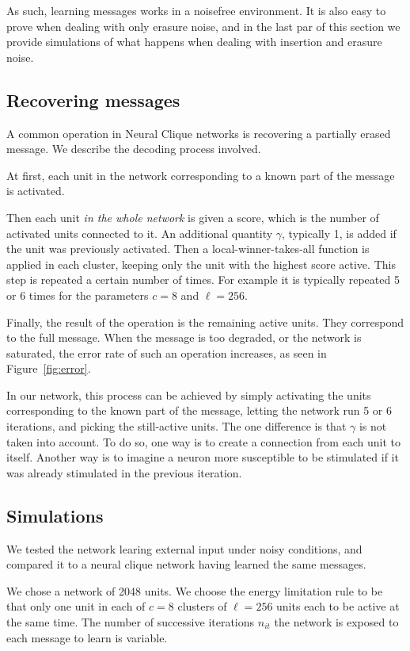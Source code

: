 \documentclass[journal]{IEEEtran}
\begin{document}
As such, learning messages works in a noisefree environment. It is also easy to prove when dealing with only erasure noise, and in the last par of this section we provide simulations of what happens when dealing with insertion and erasure noise.

\subsection{Recovering messages}

A common operation in Neural Clique networks is recovering a partially erased message. We describe the decoding process involved.

At first, each unit in the network corresponding to a known part of the message is activated. 

Then each unit \emph{in the whole network} is given a score, which is the number of activated units connected to it. An additional quantity $\gamma$, typically 1, is added if the unit was previously activated. Then a local-winner-takes-all function is applied in each cluster, keeping only the unit with the highest score active. This step is repeated a certain number of times. For example it is typically repeated 5 or 6 times for the parameters $c=8$ and $\ell=256$.

Finally, the result of the operation is the remaining active units. They correspond to the full message. When the message is too degraded, or the network is saturated, the error rate of such an operation increases, as seen in Figure~\ref{fig:error}.

In our network, this process can be achieved by simply activating the units corresponding to the known part of the message, letting the network run 5 or 6 iterations, and picking the still-active units. The one difference is that $\gamma$ is not taken into account. To do so, one way is to create a connection from each unit to itself. Another way is to imagine a neuron more susceptible to be stimulated if it was already stimulated in the previous iteration.

\subsection{Simulations}

We tested the network learing external input under noisy conditions, and compared it to a neural clique network having learned the same messages.

We chose a network of 2048 units. We choose the energy limitation rule to be that only one unit in each of $c=8$ clusters of $\ell=256$ units each to be active at the same time. The number of successive iterations $n_{it}$ the network is exposed to each message to learn is variable. 
\end{document}
